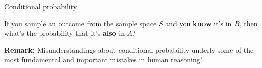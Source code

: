 \documentclass[10pt]{beamer}
\begin{document}
\begin{frame}{Conditional probability}
\begin{myredbox}[title=Example]
\end{myredbox}

\end{frame}


\begin{frame}

\begin{mygreenbox}[title=\text{Another interpretation of $P(A|B)$}]
If you sample an outcome from the sample space $S$ and you \textbf{know} it's in $B$, then what's the probability that it's \textbf{also} in $A$?
\end{mygreenbox}

\end{frame}



\begin{frame}
\Large 

\colorbox{red!30}{\textbf{Remark:}} \; Misunderstandings about conditional probability underly some of the most fundamental and important mistakes in human reasoning!


\end{frame}
\end{document}
